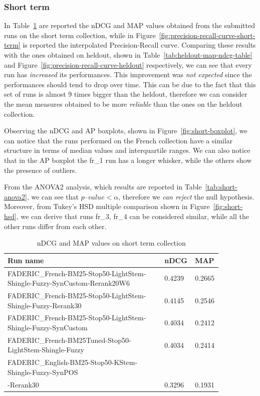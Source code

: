 \subsubsection{Short term}
\label{subsubsec:short-res}

In Table~\ref{tab:short-map-ndcg-table} are reported the \ac{nDCG} and \ac{MAP} values obtained from the submitted runs on the short term collection, while in Figure~\ref{fig:precision-recall-curve-short-term} is reported the interpolated Precision-Recall curve. Comparing these results with the ones obtained on heldout, shown in Table~\ref{tab:heldout-map-ndcg-table} and Figure~\ref{fig:precision-recall-curve-heldout} respectively, we can see that every run has \emph{increased} its performances. This improvement was \emph{not expected} since the performances should tend to drop over time. This can be due to the fact that this set of runs is almost 9 times bigger than the heldout, therefore we can consider the mean measures obtained to be more \emph{reliable} than the ones on the heldout collection.

Observing the \ac{nDCG} and \ac{AP} boxplots, shown in Figure~\ref{fig:short-boxplot}, we can notice that the runs performed on the French collection have a similar structure in terms of median values and interquartile ranges. We can also notice that in the \ac{AP} boxplot the fr\_1 run has a longer whisker, while the others show the presence of outliers.

From the ANOVA2 analysis, which results are reported in Table~\ref{tab:short-anova2}, we can see that $p\textrm{--}value<\alpha$, therefore we \emph{can reject} the null hypothesis. Moreover, from Tukey's \ac{HSD} multiple comparison shown in Figure~\ref{fig:short-hsd}, we can derive that runs fr\_3, fr\_4 can be considered similar, while all the other runs differ from each other.

\begin{table}[tbp]
\caption{\ac{nDCG} and \ac{MAP} values on short term collection}
  \label{tab:short-map-ndcg-table}
    \centering
    \begin{tabular}{|p{0.7\linewidth}|p{0.075\linewidth}|p{0.075\linewidth}|}
	\toprule
	\textbf{Run name} & \textbf{nDCG} & \textbf{MAP} \\
	\midrule
        FADERIC\_French-BM25-Stop50-LightStem-Shingle-Fuzzy-SynCustom-Rerank20W6 & 0.4239 & 0.2665 \\ 
        FADERIC\_French-BM25-Stop50-LightStem-Shingle-Fuzzy-Rerank30 & 0.4145 & 0.2546 \\ 
        FADERIC\_French-BM25-Stop50-LightStem-Shingle-Fuzzy-SynCustom & 0.4034 & 0.2412 \\ 
        FADERIC\_French-BM25Tuned-Stop50-LightStem-Shingle-Fuzzy & 0.4034 & 0.2414 \\ 
        FADERIC\_English-BM25-Stop50-KStem-Shingle-Fuzzy-SynPOS\\-Rerank30 & 0.3296 & 0.1931 \\ 
	\bottomrule
    \end{tabular}
\end{table}

